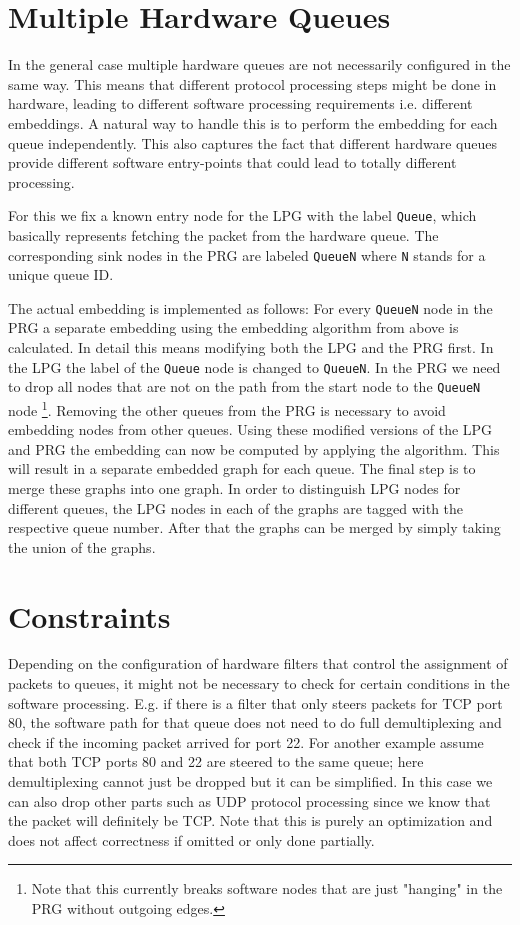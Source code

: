 \documentclass[a4paper]{article}
\begin{document}
\section{Multiple Hardware Queues}
In the general case multiple hardware queues are not necessarily configured in
the same way. This means that different protocol processing steps might be done
in hardware, leading to different software processing requirements i.e.
different embeddings. A natural way to handle this is to perform the embedding
for each queue independently. This also captures the fact that different
hardware queues provide different software entry-points that could lead to
totally different processing.

For this we fix a known entry node for the LPG with the label \texttt{Queue},
which basically represents fetching the packet from the hardware queue. The
corresponding sink nodes in the PRG are labeled \texttt{QueueN} where \texttt{N}
stands for a unique queue ID.

The actual embedding is implemented as follows: For every \texttt{QueueN} node
in the PRG a separate embedding using the embedding algorithm from above is
calculated. In detail this means modifying both the LPG and the PRG first. In
the LPG the label of the \texttt{Queue} node is changed to \texttt{QueueN}. In
the PRG we need to drop all nodes that are not on the path from the start node
to the \texttt{QueueN} node \footnote{Note that this currently breaks software
nodes that are just "hanging" in the PRG without outgoing edges.}. Removing the
other queues from the PRG is necessary to avoid embedding nodes from other
queues. Using these modified versions of the LPG and PRG the embedding can now
be computed by applying the algorithm. This will result in a separate embedded
graph for each queue. The final step is to merge these graphs into one graph. In
order to distinguish LPG nodes for different queues, the LPG nodes in each of
the graphs are tagged with the respective queue number. After that the graphs
can be merged by simply taking the union of the graphs.




\section{Constraints}
Depending on the configuration of hardware filters that control the assignment
of packets to queues, it might not be necessary to check for certain conditions
in the software processing. E.g. if there is a filter that only steers packets
for TCP port 80, the software path for that queue does not need to do full
demultiplexing and check if the incoming packet arrived for port 22. For another
example assume that both TCP ports 80 and 22 are steered to the same queue; here
demultiplexing cannot just be dropped but it can be simplified. In this case we
can also drop other parts such as UDP protocol processing since we know that the
packet will definitely be TCP. Note that this is purely an optimization and does
not affect correctness if omitted or only done partially.
\end{document}
